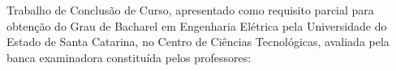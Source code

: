 
\begin{folhadeaprovacao}

Trabalho de Conclusão de Curso, apresentado como requisito parcial para obtenção do Grau de Bacharel em Engenharia Elétrica pela Universidade do Estado de Santa Catarina, no Centro de Ciências Tecnológicas, avaliada pela banca examinadora constituída pelos
professores: \setlength{\signthickness}{0.4pt}









\end{folhadeaprovacao}



